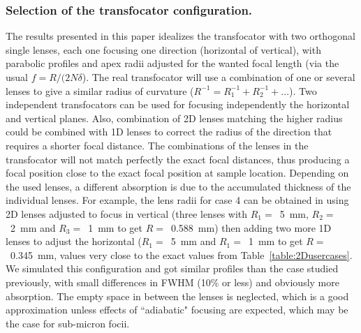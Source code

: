 \documentclass{iucr}              %
\begin{document}
\subsubsection{Selection of the transfocator configuration.} 
The results presented in this paper idealizes the transfocator with two orthogonal single lenses, each one focusing one direction (horizontal of vertical), with parabolic profiles and apex radii adjusted for the wanted focal length (via the usual $f=R/(2 N \delta$). The real transfocator will use a combination of one or several lenses to give a similar radius of curvature  ($R^{-1} = R_1^{-1} + R_2^{-1} + ...$). Two independent transfocators can be used for focusing independently the horizontal and vertical planes. Also, combination of 2D lenses matching the higher radius could be combined with 1D lenses to correct the radius of the direction that requires a shorter focal distance. The combinations of the lenses in the transfocator will not match perfectly the exact focal distances, thus producing a focal position close to the exact focal position at sample location. Depending on the used lenses, a different absorption is due to the accumulated thickness of the individual lenses. For example, the lens radii for case 4 can be obtained in using 2D lenses adjusted to focus in vertical (three lenses with $R_1=$~\SI{5}{\milli\meter}, $R_2=$~\SI{2}{\milli\meter} and $R_3=$~\SI{1}{\milli\meter} to get $R=$~\SI{0.588}{\milli\meter}) then adding two more 1D lenses to adjust the horizontal ($R_1=$~\SI{5}{\milli\meter} and $R_1=$~\SI{1}{\milli\meter} to get $R=$~\SI{0.345}{\milli\meter}, values very close to the exact values from Table~\ref{table:2Dusercases}. We simulated this configuration and got similar profiles than the case studied previously, with small differences in FWHM (10\% or less) and obviously more absorption. The empty space in between the lenses is neglected, which is a good approximation unless effects of ``adiabatic" focusing are expected, which may be the case for sub-micron focii.    
\end{document}
